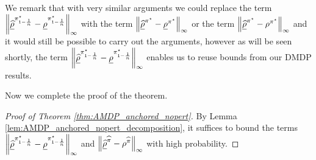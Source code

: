 \documentclass{article}
\theoremstyle{plain}
\theoremstyle{plain}
\theoremstyle{remark}
\theoremstyle{plain}
\theoremstyle{plain}
\newcommand{\pistar}{\pi^\star}
\newcommand{\pihat}{\widehat{\pi}}
\newcommand{\rhohat}{\widehat{\rho}}
\newcommand{\rhohatanc}{ \underline{\rhohat}}
\newcommand{\rhoanc}{\underline{\rho}}
\begin{document}
We remark that with very similar arguments we could replace the term $\infnorm{\rhohatanc^{\pistar_{1 - \frac{1}{n}}} - \rhoanc^{\pistar_{1-\frac{1}{n}}}}$ with the term $\infnorm{\rhohatanc^{\pistar} - \rhoanc^{\pistar}}$ or the term $\infnorm{\rhohatanc^{\pistar} - \rho^{\pistar}}$ and it would still be possible to carry out the arguments, however as will be seen shortly, the term $\infnorm{\rhohatanc^{\pistar_{1 - \frac{1}{n}}} - \rhoanc^{\pistar_{1-\frac{1}{n}}}}$ enables us to reuse bounds from our DMDP results.

Now we complete the proof of the theorem.

\begin{proof}[Proof of Theorem \ref{thm:AMDP_anchored_nopert}]
    By Lemma \ref{lem:AMDP_anchored_nopert_decomposition}, it suffices to bound the terms $\infnorm{\rhohatanc^{\pistar_{1 - \frac{1}{n}}} - \rhoanc^{\pistar_{1-\frac{1}{n}}}}$ and $\infnorm{ \rhohatanc^{\pihat} - \rho^{\pihat}}$ with high probability.


\end{proof}
\end{document}
